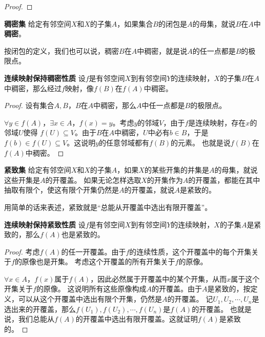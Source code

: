 \documentclass[12pt,UTF8]{ctexbook}
\begin{document}
\begin{appendix}
\begin{proof}
\end{proof}

\begin{df}{\textbf{稠密集}}
    给定有邻空间$X$和$X$的子集$A$，如果集合$B$的闭包是$A$的母集，就说$B$在$A$中\textbf{稠密}。
\end{df}

按闭包的定义，我们也可以说，稠密$B$在$A$中稠密，就是说$A$的任一点都是$B$的极限点。

\begin{tm}{\textbf{连续映射保持稠密性质}}
    设$f$是有邻空间$X$到有邻空间$Y$的连续映射，$X$的子集$B$在$A$中稠密，那么经过$f$映射，像$f(B)$在$f(A)$中稠密。
\end{tm}

\begin{proof}
    设有集合$A,B$，$B$在$A$中稠密，那么$A$中任一点都是$B$的极限点。

    $\forall y\in f(A)$，$\exists x\in A$，$f(x) = y$。考虑$y$的邻域$V$，由于$f$是连续映射，存在$x$的邻域$U$使得
    $f(U)\subseteq V$。由于$B$在$A$中稠密，$U$中必有$b\in B$，于是$f(b)\in f(U) \subseteq V$。这说明$y$的任意邻域都有$f(B)$的元素。
    也就是说$f(B)$在$f(A)$中稠密。
\end{proof}

\begin{df}{\textbf{紧致集}}
    给定有邻空间$X$和$X$的子集$A$，如果$X$的某些开集的并集是$A$的母集，就说这些开集是$A$的开覆盖。
    如果无论怎样选取$X$的开集作为$A$的开覆盖，都能在其中抽取有限个，使这有限个开集仍然是$A$的开覆盖，就说$A$是紧致的。
\end{df}

用简单的话来表述，紧致就是“总能从开覆盖中选出有限开覆盖”。

\begin{tm}{\textbf{连续映射保持紧致性质}}
    设$f$是有邻空间$X$到有邻空间$Y$的连续映射，$X$的子集$A$是紧致的，那么$f(A)$也是紧致的。
\end{tm}

\begin{proof}
    考虑$f(A)$的任一开覆盖。由于$f$的连续性质，这个开覆盖中的每个开集关于$f$的原像也是开集。
    考虑这个开覆盖的所有开集关于$f$的原像。

    $\forall x\in A$，$f(x)$属于$f(A)$，因此必然属于开覆盖中的某个开集，从而$x$属于这个开集关于$f$的原像。
    这说明所有这些原像构成$A$的开覆盖。由于$A$是紧致的，按定义，可以从这个开覆盖中选出有限个开集，仍然是$A$的开覆盖。
    记$U_1, U_2, \cdots, U_n$是选出来的开覆盖，那么$f(U_1), f(U_2), \cdots , f(U_n)$是$f(A)$的开覆盖。
    也就是说，我们总能从$f(A)$的开覆盖中选出有限开覆盖。这就证明$f(A)$是紧致的。


\end{proof}
\end{appendix}
\end{document}
